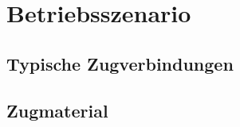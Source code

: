 \section{Betriebsszenario}
\label{sec:operation}


\subsection{Typische Zugverbindungen}
\label{sec:trainConnections}




\subsection{Zugmaterial}
\label{sec:trainMaterial}

